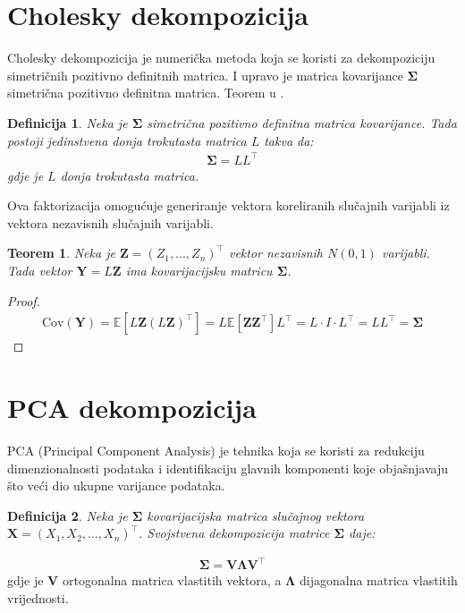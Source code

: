 \documentclass[zavrsnirad]{fer}
\newtheorem{definition}{Definicija}
\newtheorem{theorem}{Teorem}
\newtheorem{proof}{Dokaz}
\begin{document}
\section{Cholesky dekompozicija}
\label{sek:cholesky}
Cholesky dekompozicija je numerička metoda koja se koristi za
dekompoziciju simetričnih pozitivno definitnih matrica. I upravo
je matrica kovarijance $\boldsymbol{\Sigma}$ simetrična pozitivno
definitna matrica. Teorem u \cite{NumerickaMatematika}.
\begin{definition}
    \label{def:cholesky}
    Neka je $\boldsymbol{\Sigma}$ simetrična pozitivno definitna
    matrica kovarijance. Tada postoji jedinstvena donja trokutasta
    matrica $L$ takva da:
    \begin{align*}
        \boldsymbol{\Sigma} = LL^\intercal
    \end{align*}
    \indent gdje je $L$ donja trokutasta matrica.
\end{definition}
Ova faktorizacija omogućuje generiranje vektora koreliranih slučajnih varijabli
iz vektora nezavisnih slučajnih varijabli.

\begin{theorem}
Neka je $\mathbf{Z} = (Z_1, ..., Z_n)^\intercal$ vektor nezavisnih $N(0,1)$ varijabli. Tada vektor $\mathbf{Y} = L\mathbf{Z}$ ima kovarijacijsku matricu $\boldsymbol{\Sigma}$.
\end{theorem}
\begin{proof}
\begin{align*}
\text{Cov}(\mathbf{Y}) = \mathbb{E}[L\mathbf{Z}(L\mathbf{Z})^\intercal]
    = L\mathbb{E}[\mathbf{Z}\mathbf{Z}^\intercal]L^\intercal
    = L \cdot I \cdot L^\intercal = LL^\intercal = \boldsymbol{\Sigma}
\end{align*}
\end{proof}

\section{PCA dekompozicija}
\label{sek:pca}
PCA (Principal Component Analysis) je tehnika koja se koristi za
redukciju dimenzionalnosti podataka i identifikaciju glavnih komponenti koje
objašnjavaju što veći dio ukupne varijance podataka.
\begin{definition}
    Neka je $\boldsymbol{\Sigma}$ kovarijacijska matrica slučajnog
    vektora $\mathbf{X} = (X_1, X_2, \dots, X_n)^\intercal$.
    Svojstvena dekompozicija matrice
    $\boldsymbol{\Sigma}$ daje:
\end{definition}
\begin{align*}
    \boldsymbol{\Sigma} = \boldsymbol{V} \boldsymbol{\Lambda} \boldsymbol{V}^\intercal
\end{align*}
\indent gdje je $\boldsymbol{V}$ ortogonalna matrica vlastitih vektora, a
$\boldsymbol{\Lambda}$
dijagonalna matrica vlastitih vrijednosti.\\
\end{document}
